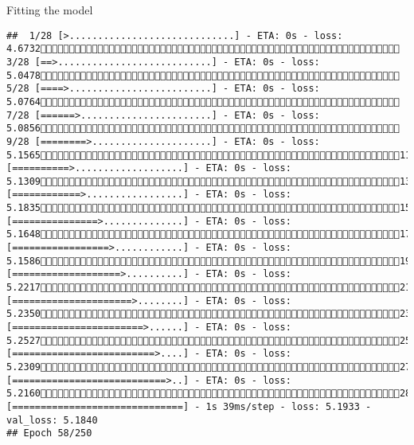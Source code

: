 \documentclass[
  ignorenonframetext,
]{beamer}
\begin{document}
\begin{frame}[fragile]{Fitting the model}
\begin{verbatim}
##  1/28 [>.............................] - ETA: 0s - loss: 4.6732 3/28 [==>...........................] - ETA: 0s - loss: 5.0478 5/28 [====>.........................] - ETA: 0s - loss: 5.0764 7/28 [======>.......................] - ETA: 0s - loss: 5.0856 9/28 [========>.....................] - ETA: 0s - loss: 5.156511/28 [==========>...................] - ETA: 0s - loss: 5.130913/28 [============>.................] - ETA: 0s - loss: 5.183515/28 [===============>..............] - ETA: 0s - loss: 5.164817/28 [=================>............] - ETA: 0s - loss: 5.158619/28 [===================>..........] - ETA: 0s - loss: 5.221721/28 [=====================>........] - ETA: 0s - loss: 5.235023/28 [=======================>......] - ETA: 0s - loss: 5.252725/28 [=========================>....] - ETA: 0s - loss: 5.230927/28 [===========================>..] - ETA: 0s - loss: 5.216028/28 [==============================] - 1s 39ms/step - loss: 5.1933 - val_loss: 5.1840
## Epoch 58/250

\end{verbatim}
\end{frame}
\end{document}

